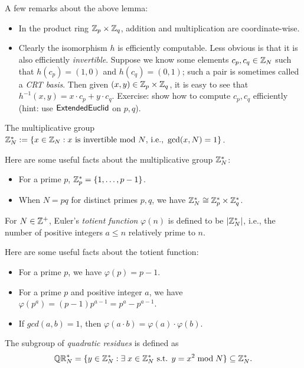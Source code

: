 \documentclass[11pt]{article}
\begin{document}
\noindent A few remarks about the above lemma:
\begin{itemize}
\item In the product ring $\mathbb{Z}_p \times \mathbb{Z}_q$, addition and
  multiplication are coordinate-wise.
\item Clearly the isomorphism $h$ is efficiently computable.  Less
  obvious is that it is also efficiently \emph{invertible}.  Suppose
  we know some elements $c_{p}, c_{q} \in \mathbb{Z}_N$ such that $h(c_{p}) =
  (1,0)$ and $h(c_{q}) = (0,1)$; such a pair is sometimes called a
  \emph{CRT basis}.  Then given $(x,y) \in \mathbb{Z}_p \times \mathbb{Z}_q$, it is easy
  to see that $h^{-1}(x,y) = x \cdot c_{p} + y \cdot c_{q}$.
  Exercise: show how to compute $c_{p}, c_{q}$ efficiently (hint: use
  $\mathsf{ExtendedEuclid}$ on $p,q$).
\end{itemize}

\begin{definition}
  The multiplicative group $\mathbb{Z}_N^{*} := \{ x \in \mathbb{Z}_N : x \text{
      is invertible mod $N$, i.e., } \gcd(x,N) = 1 \}$.
\end{definition}

\noindent Here are some useful facts about the multiplicative group
$\mathbb{Z}_N^{*}$:
\begin{itemize}
\item For a prime $p$, $\mathbb{Z}_p^{*} = \{1, \ldots, p-1\}$.
\item When $N=pq$ for distinct primes $p,q$, we have $\mathbb{Z}^{*}_N \cong
  \mathbb{Z}_p^{*} \times \mathbb{Z}_q^{*}$.
\end{itemize}

\begin{definition}
  For $N \in \mathbb{Z}^+$, Euler's \emph{totient function} $\varphi(n)$ is
  defined to be $\lvert\mathbb{Z}_N^{*}\rvert$, i.e., the number of positive integers
  $a \leq n$ relatively prime to $n$.
\end{definition}

\noindent Here are some useful facts about the totient function:
\begin{itemize}
\item For a prime $p$, we have $\varphi(p) = p - 1$.
\item For a prime $p$ and positive integer $a$, we have $\varphi(p^a)
  = (p-1) p^{a-1} = p^a - p^{a-1}$.
\item If $gcd(a,b) = 1$, then $\varphi(a \cdot b) = \varphi(a) \cdot
  \varphi(b)$.
\end{itemize}

\begin{definition}
  The subgroup of \emph{quadratic residues} is defined as \[ \mathbb{QR}_{N}^{*}
  = \{y \in \mathbb{Z}_N^{*} : \exists\; x \in \mathbb{Z}_N^{*} \text{ s.t. } y = x^2
    \bmod N\} \subseteq \mathbb{Z}_N^{*}. \]
\end{definition}
\end{document}

